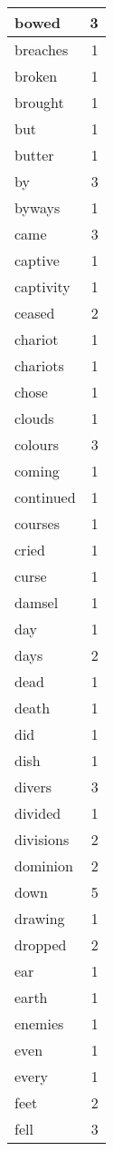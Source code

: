 \begin{center}
\begin{longtable}{l|r}
bowed & 3\\ \hline 
breaches & 1\\ \hline 
broken & 1\\ \hline 
brought & 1\\ \hline 
but & 1\\ \hline 
butter & 1\\ \hline 
by & 3\\ \hline 
byways & 1\\ \hline 
came & 3\\ \hline 
captive & 1\\ \hline 
captivity & 1\\ \hline 
ceased & 2\\ \hline 
chariot & 1\\ \hline 
chariots & 1\\ \hline 
chose & 1\\ \hline 
clouds & 1\\ \hline 
colours & 3\\ \hline 
coming & 1\\ \hline 
continued & 1\\ \hline 
courses & 1\\ \hline 
cried & 1\\ \hline 
curse & 1\\ \hline 
damsel & 1\\ \hline 
day & 1\\ \hline 
days & 2\\ \hline 
dead & 1\\ \hline 
death & 1\\ \hline 
did & 1\\ \hline 
dish & 1\\ \hline 
divers & 3\\ \hline 
divided & 1\\ \hline 
divisions & 2\\ \hline 
dominion & 2\\ \hline 
down & 5\\ \hline 
drawing & 1\\ \hline 
dropped & 2\\ \hline 
ear & 1\\ \hline 
earth & 1\\ \hline 
enemies & 1\\ \hline 
even & 1\\ \hline 
every & 1\\ \hline 
feet & 2\\ \hline 
fell & 3\\ \hline 

\end{longtable}
\end{center}
